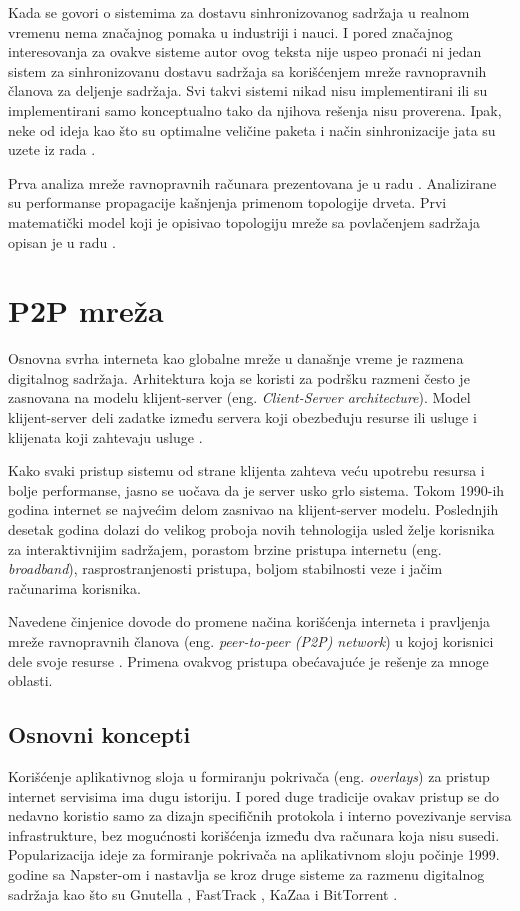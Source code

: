 \documentclass[12pt,oneside]{memoir}
\begin{document}
Kada se govori o sistemima za dostavu sinhronizovanog sadržaja u realnom vremenu nema značajnog pomaka u industriji i nauci. I pored značajnog interesovanja za ovakve sisteme autor ovog teksta nije uspeo pronaći ni jedan sistem za sinhronizovanu dostavu sadržaja sa korišćenjem mreže ravnopravnih članova za deljenje sadržaja. Svi takvi sistemi nikad nisu implementirani ili su implementirani samo konceptualno tako da njihova rešenja nisu proverena. Ipak, neke od ideja kao što su optimalne veličine paketa i način sinhronizacije jata su uzete iz rada \cite{Zhang4698112}.

Prva analiza mreže ravnopravnih računara prezentovana je u radu \cite{Small}. Analizirane su performanse propagacije kašnjenja primenom topologije drveta. Prvi matematički model koji je opisivao topologiju mreže sa povlačenjem sadržaja opisan je u radu \cite{EURECOM+2326}.

\chapter{P2P mreža}
\label{chp:p2p-uvod}

Osnovna svrha interneta kao globalne mreže u današnje vreme je razmena digitalnog sadržaja. Arhitektura koja se koristi za podršku razmeni često je zasnovana na modelu klijent-server (eng. \textit{Client-Server architecture}). Model klijent-server deli zadatke između servera koji obezbeđuju resurse ili usluge i klijenata koji zahtevaju usluge \cite{DeBoever07}.

Kako svaki pristup sistemu od strane klijenta zahteva veću upotrebu resursa i bolje performanse, jasno se uočava da je server usko grlo sistema. 
Tokom 1990-ih godina internet se najvećim delom zasnivao na klijent-server modelu. Poslednjih desetak godina dolazi do velikog proboja novih tehnologija usled želje korisnika za interaktivnijim sadržajem, porastom brzine pristupa internetu (eng. \textit{broadband}), rasprostranjenosti pristupa, boljom stabilnosti veze i jačim računarima korisnika.

Navedene činjenice dovode do promene načina korišćenja interneta i pravljenja mreže ravnopravnih članova (eng. \textit{peer-to-peer (P2P) network}) u kojoj korisnici dele svoje resurse \cite{Tanenbaum}. Primena ovakvog pristupa obećavajuće je rešenje za mnoge oblasti.

\section{Osnovni koncepti}
\label{P2P.1}
Korišćenje aplikativnog sloja u formiranju pokrivača (eng. \textit{overlays}) za pristup internet servisima ima dugu istoriju. I pored duge tradicije ovakav pristup se do nedavno koristio samo za dizajn specifičnih protokola i interno povezivanje servisa infrastrukture, bez mogućnosti korišćenja između dva računara koja nisu susedi. Popularizacija ideje za formiranje pokrivača na aplikativnom sloju počinje 1999. godine sa Napster-om \cite{Aberer_2004} i nastavlja se kroz druge sisteme za razmenu digitalnog sadržaja kao što su Gnutella \cite{Gnutella}, FastTrack \cite{FastTrack}, KaZaa \cite{kazaa} i BitTorrent \cite{Bittorent}. 
\end{document}
